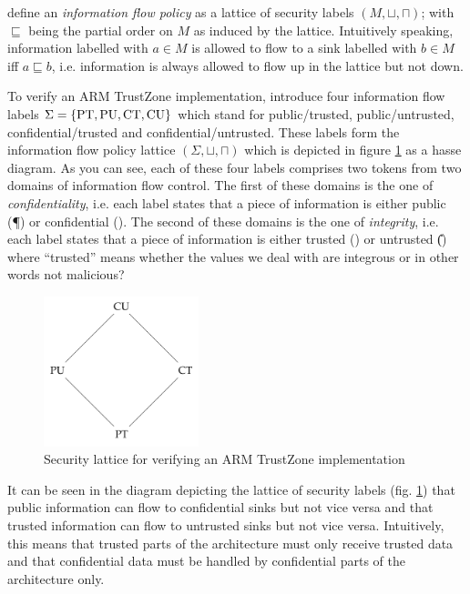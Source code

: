 \citeauthor{Ferraiuolo17} define an \textit{information flow policy} as a lattice of security labels $ (M, \sqcup, \sqcap) $; with $ \sqsubseteq $ being the partial order on $ M $ as induced by the lattice.
Intuitively speaking, information labelled with $ a \in M $ is allowed to flow to a sink labelled with $ b \in M $ iff $ a \sqsubseteq b $, i.e. information is always allowed to flow up in the lattice but not down.

\begin{example}
    To verify an ARM TrustZone implementation, \citeauthor{Ferraiuolo17} introduce four information flow labels $ \Sigma = \{ \text{PT}, \text{PU}, \text{CT}, \text{CU} \} $ which stand for public/trusted, public/untrusted, confidential/trusted and confidential/untrusted.
    These labels form the information flow policy lattice $ (\Sigma, \sqcup, \sqcap) $ which is depicted in figure \ref{fig:sec-lattice} as a hasse diagram.
    As you can see, each of these four labels comprises two tokens from two domains of information flow control.
    The first of these domains is the one of \textit{confidentiality}, i.e. each label states that a piece of information is either public (\P{}) or confidential (\C{}).
    The second of these domains is the one of \textit{integrity}, i.e. each label states that a piece of information is either trusted (\T{}) or untrusted (\U{}) where \enquote{trusted} means whether
    the values we deal with are integrous or in other words not malicious?

    \begin{figure}
        \centering
        \includegraphics[width=0.4\textwidth]{figures/ifp-lattice.png}
        \caption{Security lattice for verifying an ARM TrustZone implementation \cite{Ferraiuolo17}}
        \label{fig:sec-lattice}
    \end{figure}

    It can be seen in the diagram depicting the lattice of security labels (fig. \ref{fig:sec-lattice}) that public information can flow to confidential sinks but not vice versa and that trusted information can flow to untrusted sinks but not vice versa.
    Intuitively, this means that trusted parts of the architecture must only receive trusted data and that confidential data must be handled by confidential parts of the architecture only.
\end{example}

